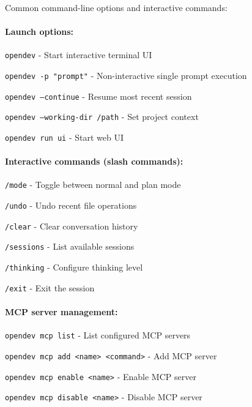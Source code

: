 Common command-line options and interactive commands:

\paragraph{Launch options:}
\begin{packeditemize}
\item \texttt{opendev} - Start interactive terminal UI
\item \texttt{opendev -p "prompt"} - Non-interactive single prompt execution
\item \texttt{opendev --continue} - Resume most recent session
\item \texttt{opendev --working-dir /path} - Set project context
\item \texttt{opendev run ui} - Start web UI
\end{packeditemize}

\paragraph{Interactive commands (slash commands):}
\begin{packeditemize}
\item \texttt{/mode} - Toggle between normal and plan mode
\item \texttt{/undo} - Undo recent file operations
\item \texttt{/clear} - Clear conversation history
\item \texttt{/sessions} - List available sessions
\item \texttt{/thinking} - Configure thinking level
\item \texttt{/exit} - Exit the session
\end{packeditemize}

\paragraph{MCP server management:}
\begin{packeditemize}
\item \texttt{opendev mcp list} - List configured MCP servers
\item \texttt{opendev mcp add <name> <command>} - Add MCP server
\item \texttt{opendev mcp enable <name>} - Enable MCP server
\item \texttt{opendev mcp disable <name>} - Disable MCP server
\end{packeditemize}

